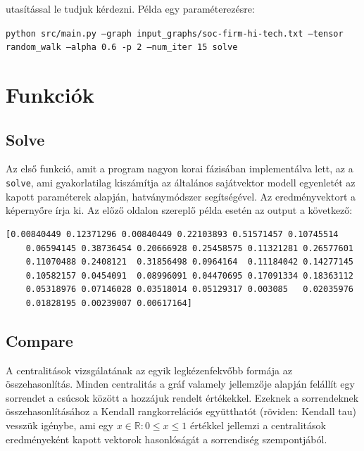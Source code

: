 \documentclass[12pt,numbers=noenddot]{report}
\begin{document}
\noindent
utasítással le tudjuk kérdezni.
Példa egy paraméterezésre:

\texttt{python src/main.py --graph input\_graphs/soc-firm-hi-tech.txt --tensor random\_walk --alpha 0.6 -p 2 --num\_iter 15 solve}



\chapter{Funkciók}


\section{Solve}

Az első funkció, amit a program nagyon korai fázisában implementálva lett, 
az a \texttt{solve}, ami gyakorlatilag kiszámítja az általános sajátvektor 
modell egyenletét az kapott paraméterek alapján, hatványmódszer segítségével.
Az eredményvektort a képernyőre írja ki. Az előző oldalon szereplő példa esetén
az output a következő:

\vspace{0.4cm}

\footnotesize
\noindent
\begin{verbatim}
[0.00840449 0.12371296 0.00840449 0.22103893 0.51571457 0.10745514
	0.06594145 0.38736454 0.20666928 0.25458575 0.11321281 0.26577601
	0.11070488 0.2408121  0.31856498 0.0964164  0.11184042 0.14277145
	0.10582157 0.0454091  0.08996091 0.04470695 0.17091334 0.18363112
	0.05318976 0.07146028 0.03518014 0.05129317 0.003085   0.02035976
	0.01828195 0.00239007 0.00617164]
\end{verbatim}
\normalfont

\section{Compare}

A centralitások vizsgálatának az egyik legkézenfekvőbb formája az 
összehasonlítás. Minden centralitás a gráf valamely jellemzője alapján
felállít egy sorrendet a csúcsok között a hozzájuk rendelt értékekkel.
Ezeknek a sorrendeknek összehasonlításához a Kendall rangkorrelációs 
együtthatót (röviden: Kendall tau) vesszük igénybe, ami egy 
$x \in \mathbb{R}: 0 \leq x \leq 1$
értékkel jellemzi a centralitások eredményeként kapott vektorok hasonlóságát
a sorrendiség szempontjából.
\end{document}
